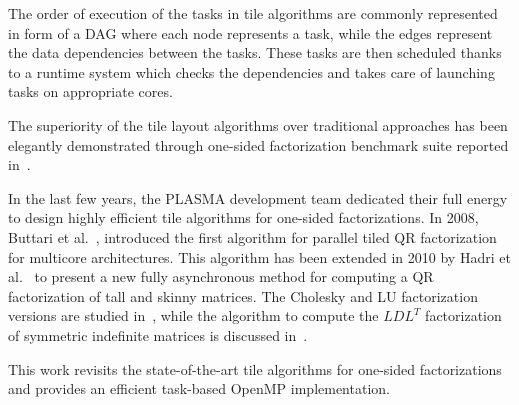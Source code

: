 The order of execution of the tasks in tile algorithms are commonly
represented in form of a DAG where each node represents a task, while
the edges represent the data dependencies between the tasks.  These
tasks are then scheduled thanks to a runtime system which checks the
dependencies and takes care of launching tasks on appropriate cores.

The superiority of the tile layout algorithms over traditional
approaches has been elegantly demonstrated through one-sided
factorization benchmark suite reported in~\cite{agullo2009comparative}.

In the last few years,
the PLASMA development team dedicated their full
energy to design highly efficient tile
algorithms for one-sided factorizations.
In 2008, Buttari et al.~\cite{buttari2008parallel},
introduced the first algorithm for parallel tiled QR factorization for
multicore architectures.
This algorithm has been extended in 2010 by
Hadri et al.~\cite{hadri2010tile} to present a new fully asynchronous
method for computing a QR factorization of tall and skinny matrices.
The Cholesky and LU factorization versions are studied
in~\cite{DBLP:journals/corr/abs-0709-1272}, while the algorithm to
compute the $LDL^T$ factorization of symmetric indefinite matrices is
discussed in~\cite{becker2011towards}.

This work revisits the state-of-the-art tile algorithms for
one-sided factorizations and provides an
efficient task-based OpenMP implementation.
